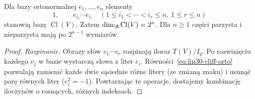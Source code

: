 \begin{twierdzenie}
\label{thm:lin30-cliff-baza}
Dla bazy ortonormalnej $e_1,\ldots,e_n$ elementy
\[
 1,\qquad e_{i_1}\cdots e_{i_r}
 \quad(1\leq i_1<\cdots<i_r\leq n,\ 1\leq r\leq n)
\]
stanowią bazę $\operatorname{Cl}(V)$. Zatem
$\dim_\R\operatorname{Cl}(V)=2^n$.
Dla $n\geq1$ części parzysta i nieparzysta mają
po $2^{n-1}$ wymiarów.
\end{twierdzenie}
\begin{proof}
\emph{Rozpinanie.} Obrazy słów $v_1\cdots v_r$
rozpinają iloraz $T(V)/I_q$. Po rozwinięciu każdego
$v_j$ w bazie wystarczą słowa z liter $e_i$.
Równości~\eqref{eq:lin30-cliff-orto} pozwalają zamienić
każde dwie sąsiednie różne litery (ze zmianą znaku)
i usunąć parę równych liter ($e_i^2=-1$).
Powtarzając te operacje, dostajemy kombinację
iloczynów o rosnących, różnych indeksach.


\end{proof}
